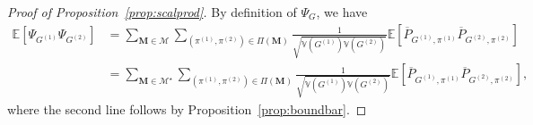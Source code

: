 \documentclass[final]{colt2026}
\newcommand{\1}{\mathbf{1}}
\begin{document}
\begin{proof}[Proof of Proposition~\ref{prop:scalprod}]
By definition of $\Psi_G$, we have 
\begin{align*}
     \mathbb E\left[\Psi_{G^{(1)}}\Psi_{G^{(2)}}\right]  &= \sum_{\mathbf{M}\in\mathcal{M}}\sum_{(\pi^{(1)}, \pi^{(2)})\in \Pi(\mathbf{M})}\frac{1}{\sqrt{\mathbb{V}(G^{(1)})\mathbb{V}(G^{(2)})}}\mathbb{E}\left[\overline{P}_{G^{(1)}, \pi^{(1)}}\overline{P}_{G^{(2)}, \pi^{(2)}}\right]\\
     &= \sum_{\mathbf{M}\in\mathcal{M}^{\star}}\sum_{(\pi^{(1)}, \pi^{(2)})\in \Pi(\mathbf{M})}\frac{1}{\sqrt{\mathbb{V}(G^{(1)})\mathbb{V}(G^{(2)})}}\mathbb{E}\left[\overline{P}_{G^{(1)}, \pi^{(1)}}\overline{P}_{G^{(2)}, \pi^{(2)}}\right],
    \end{align*}
where the second line follows by Proposition~\ref{prop:boundbar}. 


\end{proof}
\end{document}
